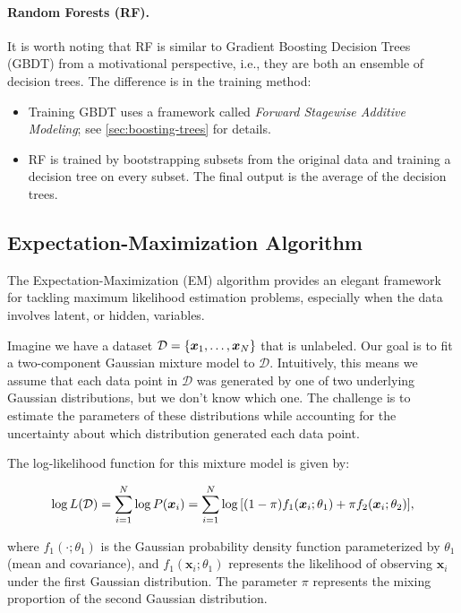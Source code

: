 {    
    
    \paragraph{Random Forests (RF).} It is worth noting that RF is similar to Gradient Boosting Decision Trees (GBDT) from a motivational perspective, i.e., they are both an ensemble of decision trees.
    The difference is in the training method:
        \begin{itemize}
            \item Training GBDT uses a framework called \emph{Forward Stagewise Additive Modeling}; see \ref{sec:boosting-trees} for details.
            \item RF is trained by bootstrapping subsets from the original data and training a decision tree on every subset. 
            The final output is the average of the decision trees.
        \end{itemize}



\subsection{Expectation-Maximization Algorithm}
The Expectation-Maximization (EM) algorithm provides an elegant framework for tackling maximum likelihood estimation problems, especially when the data involves latent, or hidden, variables. 

Imagine we have a dataset \(\mathcal{D} = \{\bm{x}_1, \ldots, \bm{x}_N\}\) that is unlabeled. Our goal is to fit a two-component Gaussian mixture model to \(\mathcal{D}\). Intuitively, this means we assume that each data point in \(\mathcal{D}\) was generated by one of two underlying Gaussian distributions, but we don't know which one. The challenge is to estimate the parameters of these distributions while accounting for the uncertainty about which distribution generated each data point.

The log-likelihood function for this mixture model is given by:

\begin{equation}
    \log L(\mathcal{D}) = \sum_{i=1}^{N}{\log P(\bm{x}_i)} = \sum_{i=1}^{N}{\log\left[ (1-\pi)f_1(\bm{x}_i; \theta_1) + \pi f_2(\bm{x}_i; \theta_2) \right]},
\end{equation}

where \(f_1(\cdot; \theta_1)\) is the Gaussian probability density function parameterized by \(\theta_1\) (mean and covariance), and \(f_1(\bm{x}_i; \theta_1)\) represents the likelihood of observing \(\bm{x}_i\) under the first Gaussian distribution. The parameter \(\pi\) represents the mixing proportion of the second Gaussian distribution.

}
